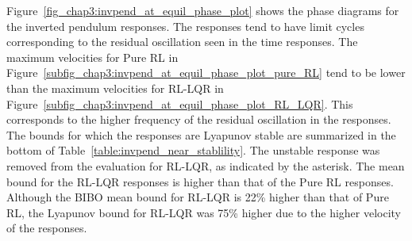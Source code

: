 Figure~\ref{fig_chap3:invpend_at_equil_phase_plot} shows the phase diagrams for the inverted pendulum responses. The responses tend to have limit cycles corresponding to the residual oscillation seen in the time responses. The maximum velocities for Pure RL in Figure~\ref{subfig_chap3:invpend_at_equil_phase_plot_pure_RL} tend to be lower than the maximum velocities for RL-LQR in Figure~\ref{subfig_chap3:invpend_at_equil_phase_plot_RL_LQR}. This corresponds to the higher frequency of the residual oscillation in the responses.
%
The bounds for which the responses are Lyapunov stable are summarized in the bottom of Table~\ref{table:invpend_near_stablility}. The unstable response was removed from the evaluation for RL-LQR, as indicated by the asterisk. The mean bound for the RL-LQR responses is higher than that of the Pure RL responses. Although the BIBO mean bound for RL-LQR is 22\% higher than that of Pure RL, the Lyapunov bound for RL-LQR was 75\% higher due to the higher velocity of the responses.
%
